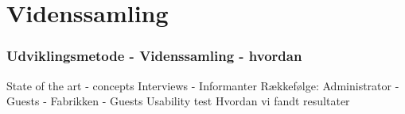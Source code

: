 \section{Videnssamling}
\begin{frame}
	\frametitle{Udviklingsmetode - Videnssamling - hvordan}
	State of the art - concepts
	Interviews - Informanter
	Rækkefølge: Administrator - Guests - Fabrikken - Guests
	Usability test
	Hvordan vi fandt resultater
\end{frame}
